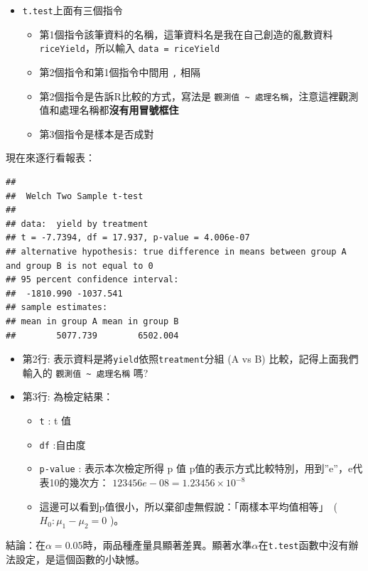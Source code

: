 \documentclass[
]{book}
\providecommand{\tightlist}{%
  \setlength{\itemsep}{0pt}\setlength{\parskip}{0pt}}
\begin{document}
\begin{itemize}
\tightlist
\item
  \texttt{t.test}上面有三個指令

  \begin{itemize}
  \tightlist
  \item
    第1個指令該筆資料的名稱，這筆資料名是我在自己創造的亂數資料\texttt{riceYield}，所以輸入 \texttt{data\ =\ riceYield}
  \item
    第2個指令和第1個指令中間用 \texttt{,} 相隔
  \item
    第2個指令是告訴R比較的方式，寫法是 \texttt{觀測值\ \textasciitilde{}\ 處理名稱}，注意這裡觀測值和處理名稱都\textbf{沒有用冒號框住}
  \item
    第3個指令是樣本是否成對
  \end{itemize}
\end{itemize}

現在來逐行看報表：

\begin{verbatim}
## 
##  Welch Two Sample t-test
## 
## data:  yield by treatment
## t = -7.7394, df = 17.937, p-value = 4.006e-07
## alternative hypothesis: true difference in means between group A and group B is not equal to 0
## 95 percent confidence interval:
##  -1810.990 -1037.541
## sample estimates:
## mean in group A mean in group B 
##        5077.739        6502.004
\end{verbatim}

\begin{itemize}
\item
  第2行: 表示資料是將\texttt{yield}依照\texttt{treatment}分組 (A vs B) 比較，記得上面我們輸入的 \texttt{觀測值\ \textasciitilde{}\ 處理名稱} 嗎?
\item
  第3行: 為檢定結果：

  \begin{itemize}
  \item
    \texttt{t} : t 值
  \item
    \texttt{df} :自由度
  \item
    \texttt{p-value} : 表示本次檢定所得 p 值
    p值的表示方式比較特別，用到''e''，e代表10的幾次方：
    \(123456e-08 = 1.23456 \times 10^{-8}\)
  \item
    這邊可以看到p值很小，所以棄卻虛無假說：「兩樣本平均值相等」　( \(H_0:\mu_1 - \mu_2 =0\) )。
  \end{itemize}
\end{itemize}

結論：在\(\alpha = 0.05\)時，兩品種產量具顯著差異。顯著水準\(\alpha\)在\texttt{t.test}函數中沒有辦法設定，是這個函數的小缺憾。
\end{document}
